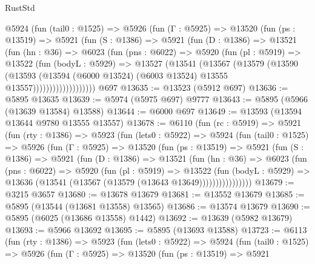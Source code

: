 \begin{lexlean}{RustStd}
\begin{coremodule}
{{          @5924
            (fun (tail0 : @1525) =>
            @5926
              (fun (Γ : @5925) =>
              @13520
                (fun (ps : @13519) =>
                @5921
                  (fun (S : @1386) =>
                  @5921
                    (fun (D : @1386) =>
                    @13521
                      (fun (hn : @36) =>
                      @6023
                        (fun (pns : @6022) =>
                        @5920
                          (fun (pl : @5919) =>
                          @13522
                            (fun (bodyL : @5929) =>
                            @13527
                              (@13541
                                (@13567
                                  (@13579
                                    (@13590
                                      (@13593
                                        (@13594
                                          (@6000 @13524)
                                          (@6003 @13524)
                                          @13555
                                          @13557)))))))))))))))))))
    @697
@13635 := @13523 (@5912 @697)
@13636 := @5895 @13635
@13639 := @5974 (@5975 @697) @9777
@13643 := @5895 (@5966 (@13639 @13584) @13588)
@13644 := @6000 @697
@13649 := @13593 (@13594 @13644 @9780 @13555 @13557)
@13678 := @6110
    (fun (rc : @5919) =>
    @5921
      (fun (rty : @1386) =>
      @5923
        (fun (lets0 : @5922) =>
        @5924
          (fun (tail0 : @1525) =>
          @5926
            (fun (Γ : @5925) =>
            @13520
              (fun (ps : @13519) =>
              @5921
                (fun (S : @1386) =>
                @5921
                  (fun (D : @1386) =>
                  @13521
                    (fun (hn : @36) =>
                    @6023
                      (fun (pns : @6022) =>
                      @5920
                        (fun (pl : @5919) =>
                        @13522
                          (fun (bodyL : @5929) =>
                          @13636 (@13541 (@13567 (@13579 (@13643 @13649))))))))))))))))
@13679 := @3215 @3657
@13680 := @13678 @13679
@13681 := @13552 @13679
@13685 := @5895 (@13544 (@13681 @13558) @13565)
@13686 := @13574 @13679
@13690 := @5895 (@6025 (@13686 @13558) @1442)
@13692 := @13639 (@5982 @13679)
@13693 := @5966 @13692
@13695 := @5895 (@13693 @13588)
@13723 := @6113
    (fun (rty : @1386) =>
    @5923
      (fun (lets0 : @5922) =>
      @5924
        (fun (tail0 : @1525) =>
        @5926
          (fun (Γ : @5925) =>
          @13520
            (fun (ps : @13519) =>
            @5921
}}
\end{coremodule}
\end{lexlean}
